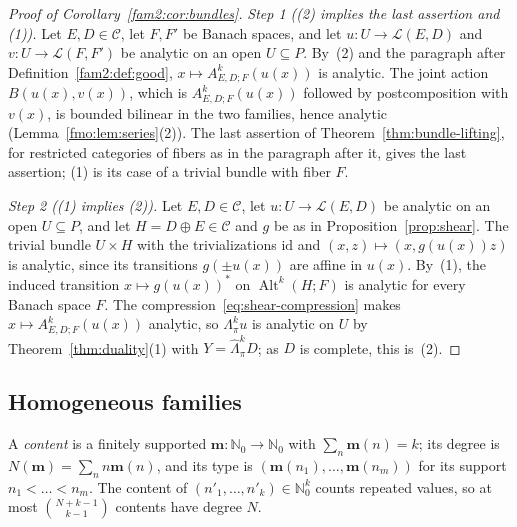 \documentclass[11pt]{amsart}
\theoremstyle{definition}
\theoremstyle{remark}
\numberwithin{equation}{section}
\newcommand{\N}{\mathbb N}
\newcommand{\cL}{\mathcal L}
\newcommand{\Alt}{\operatorname{Alt}}
\newcommand{\id}{\mathrm{id}}
\newcommand{\cC}{\mathcal{C}}
\theoremstyle{plain}
\theoremstyle{definition}
\theoremstyle{plain}
\newcommand{\hLambda}{\widehat\Lambda}
\begin{document}
\begin{proof}[Proof of Corollary~\ref{fam2:cor:bundles}]
\emph{Step 1 ((2) implies the last assertion and (1)).} Let $E,D\in\cC$, let $F,F'$ be Banach spaces, and let
$u\colon U\to\cL(E,D)$ and $v\colon U\to\cL(F,F')$ be analytic on an open $U\subseteq P$. By~(2) and the paragraph after
Definition~\ref{fam2:def:good}, $x\mapsto A^k_{E,D;F}(u(x))$ is analytic. The joint action $B(u(x),v(x))$, which is
$A^k_{E,D;F}(u(x))$ followed by postcomposition with $v(x)$, is bounded bilinear in the two families, hence analytic
(Lemma~\ref{fmo:lem:series}(2)). The last assertion of Theorem~\ref{thm:bundle-lifting}, for restricted categories of
fibers as in the paragraph after it, gives the last assertion; (1) is its case of a trivial bundle with fiber $F$.

\emph{Step 2 ((1) implies (2)).} Let $E,D\in\cC$, let $u\colon U\to\cL(E,D)$ be analytic on an open $U\subseteq P$, and let
$H=D\oplus E\in\cC$ and $g$ be as in Proposition~\ref{prop:shear}. The trivial bundle $U\times H$ with the trivializations
$\id$ and $(x,z)\mapsto(x,g(u(x))z)$ is analytic, since its transitions $g(\pm u(x))$ are affine in $u(x)$. By~(1), the
induced transition $x\mapsto g(u(x))^*$ on $\Alt^k(H;F)$ is analytic for every Banach space $F$. The
compression~\eqref{eq:shear-compression} makes $x\mapsto A^k_{E,D;F}(u(x))$ analytic, so $\Lambda^k_\pi u$ is analytic on
$U$ by Theorem~\ref{thm:duality}(1) with $Y=\hLambda^k_\pi D$; as $D$ is complete, this is~(2).
\end{proof}

\subsection{Homogeneous families}\label{fmo:ssec:reduction}

A \emph{content} is a finitely supported $\mathbf m\colon\N_0\to\N_0$ with $\sum_n\mathbf m(n)=k$; its degree is
$N(\mathbf m)=\sum_nn\mathbf m(n)$, and its type is $(\mathbf m(n_1),\dots,\mathbf m(n_m))$ for its support $n_1<\dots<n_m$.
The content of $(n'_1,\dots,n'_k)\in\N_0^k$ counts repeated values, so at most $\binom{N+k-1}{k-1}$ contents have degree $N$.
\end{document}

